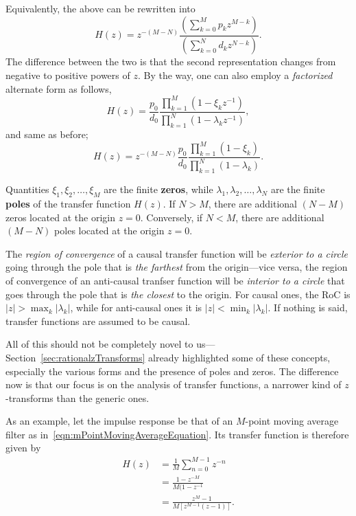 \documentclass[\documentfontsize, twocolumn]{\classname}
\begin{document}
Equivalently, the above can be rewritten into
\begin{equation}\label{eqn:transferFunctionRecursiveSystemsAlternate}
    H(z) = z^{-(M-N)} \frac {
        \left(\sum_{k=0}^M p_k z^{M-k}\right)
    } {
        \left(\sum_{k=0}^N d_k z^{N-k}\right)
    }.
\end{equation}
The difference between the two is that the second representation changes from negative to positive powers of $z$. By the way, one can also employ a \emph{factorized} alternate form as follows,
\begin{equation}\label{eqn:transferFunctionRecursiveSystemsFactorized}
    H(z) = \frac{p_0}{d_0} \frac {
        \prod_{k=1}^M (1 - \xi_k z^{-1})
    } {
        \prod_{k=1}^N (1 - \lambda_k z^{-1})
    },
\end{equation}
and same as before;
\begin{equation}\label{eqn:transferFunctionRecursiveSystemsFactorizedAlternate}
    H(z) = z^{-(M-N)} \frac{p_0}{d_0} \frac {
        \prod_{k=1}^M (1 - \xi_k)
    } {
        \prod_{k=1}^N (1 - \lambda_k)
    }.
\end{equation}

Quantities $\xi_1, \xi_2, \dots, \xi_M$ are the finite \textbf{zeros}, while $\lambda_1, \lambda_2, \dots, \lambda_N$ are the finite \textbf{poles} of the transfer function $H(z)$. If $N > M$, there are additional $(N-M)$ zeros located at the origin $z=0$. Conversely, if $N < M$, there are additional $(M - N)$ poles located at the origin $z=0$.

The \emph{region of convergence} of a causal transfer function will be \emph{exterior to a circle} going through the pole that is \emph{the farthest} from the origin---vice versa, the region of convergence of an anti-causal tranfser function will be \emph{interior to a circle} that goes through the pole that is \emph{the closest} to the origin. For causal ones, the RoC is $|z| > \max_{k}|\lambda_k|$, while for anti-causal ones it is $|z| < \min_k |\lambda_k|$. If nothing is said, transfer functions are assumed to be causal.

All of this should not be completely novel to us---Section~\ref{sec:rationalzTransforms} already highlighted some of these concepts, especially the various forms and the presence of poles and zeros. The difference now is that our focus is on the analysis of transfer functions, a narrower kind of $z$-transforms than the generic ones.

As an example, let the impulse response be that of an $M$-point moving average filter as in~\ref{eqn:mPointMovingAverageEquation}. Its transfer function is therefore given by
\begin{align*}
    H(z) 
    &= \frac 1 M \sum_{n=0}^{M-1} z^{-n}\\
    &= \frac {1 - z^{-M}}{M(1 - z^{-1}}\\
    &= \frac {z^{M} - 1}{M[z^{M-1}(z - 1)]}.
\end{align*}
\end{document}
